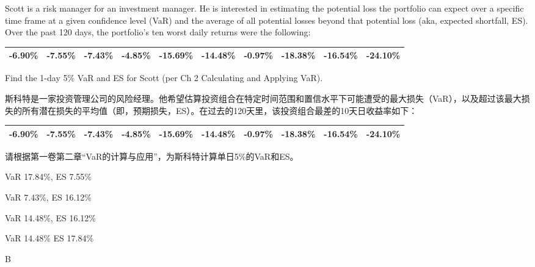 \documentclass{article}
\newcounter{question} %
\begin{document}
\begin{question}
    Scott is a risk manager for an investment manager. He is interested in estimating the potential loss the portfolio can expect over a specific time frame at a given confidence level (VaR) and the average of all potential losses beyond that potential loss (aka, expected shortfall, ES). Over the past 120 days, the portfolio’s ten worst daily returns were the following:\\
    \begin{tabular}{|r|r|r|r|r|r|r|r|r|r|}
        \hline
        -6.90\% & -7.55\% & -7.43\% & -4.85\% & -15.69\% & -14.48\% & -0.97\% & -18.38\% & -16.54\% & -24.10\% \\
        \hline
    \end{tabular}
    
    Find the 1-day 5\% VaR and ES for Scott (per Ch 2 Calculating and Applying VaR).

    斯科特是一家投资管理公司的风险经理。他希望估算投资组合在特定时间范围和置信水平下可能遭受的最大损失（VaR），以及超过该最大损失的所有潜在损失的平均值（即，预期损失，ES）。在过去的120天里，该投资组合最差的10天日收益率如下：\\
    \begin{tabular}{|r|r|r|r|r|r|r|r|r|r|}
        \hline
        -6.90\% & -7.55\% & -7.43\% & -4.85\% & -15.69\% & -14.48\% & -0.97\% & -18.38\% & -16.54\% & -24.10\% \\
        \hline
    \end{tabular}
    
    请根据第一卷第二章“VaR的计算与应用”，为斯科特计算单日5\%的VaR和ES。
   
\end{question}

\begin{choices}
    \item VaR 17.84\%, ES 7.55\%
    \item VaR 7.43\%, ES 16.12\%
    \item VaR 14.48\%, ES 16.12\%
    \item VaR 14.48\% ES 17.84\%
\end{choices}

\begin{correctanswer}
B
\end{correctanswer}
\end{document}

